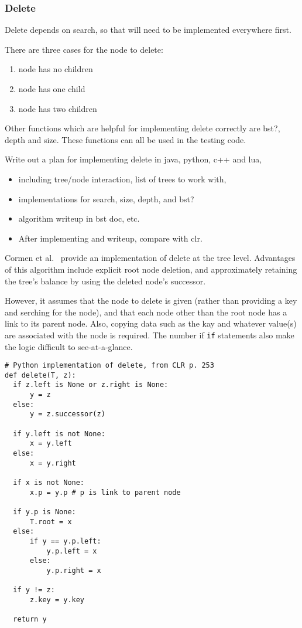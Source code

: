 \documentclass{article}
\begin{document}
\subsubsection{Delete}

Delete depends on search, so that will need to be implemented everywhere first.

There are three cases for the node to delete:

\begin{enumerate}
\item node has no children
\item node has one child
\item node has two children
\end{enumerate}

Other functions which are helpful for implementing delete correctly
are bst?, depth and size. These functions can all be used in the testing
code.

Write out a plan for implementing delete in java, python, c++ and lua,

\begin{itemize}
  \item including tree/node interaction, list of trees to work with,
  \item implementations for search, size, depth, and bst?
  \item algorithm writeup in bst doc, etc.
  \item After implementing and writeup, compare with clr.
\end{itemize}

Cormen et al.~\cite[p. 253]{cormen:th:1990} provide an implementation of
delete at the tree level. Advantages of this algorithm include explicit root node
deletion, and approximately retaining the tree's balance by using the deleted
node's successor.

However, it assumes that the node to delete is
given (rather than providing a key and serching for the node), and that
each node other than the root node has a link to its parent node.
Also, copying data such as the kay and whatever value(s) are associated
with the node is required. The number if {\tt if} statements also make
the logic difficult to see-at-a-glance.

\begin{lstlisting}[frame=single]
# Python implementation of delete, from CLR p. 253
def delete(T, z):
  if z.left is None or z.right is None:
      y = z
  else:
      y = z.successor(z)

  if y.left is not None:
      x = y.left
  else:
      x = y.right

  if x is not None:
      x.p = y.p # p is link to parent node

  if y.p is None:
      T.root = x
  else:
      if y == y.p.left:
          y.p.left = x
      else:
          y.p.right = x

  if y != z:
      z.key = y.key

  return y

\end{lstlisting}
\end{document}
